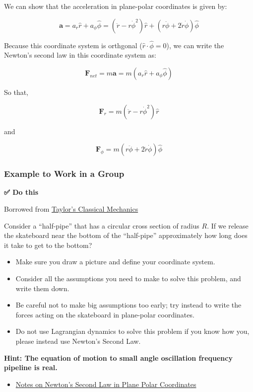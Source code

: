 We can show that the acceleration in plane-polar coordinates is given
by:

\[\mathbf{a} = a_r\hat{r} + a_{\phi}\hat{\phi} = \left(\ddot{r}-r\dot{\phi}^2\right)\hat{r} + \left(r\ddot{\phi}+2\dot{r}\dot{\phi}\right)\hat{\phi}\]

Because this coordinate system is orthgonal
(\(\hat{r}\cdot\hat{\phi} = 0\)), we can write the Newton's second law
in this coordinate system as:

\[\mathbf{F}_{net} = m\mathbf{a} = m\left(a_r\hat{r} + a_{\phi}\hat{\phi} \right)\]

So that,

\[\mathbf{F}_r = m\left(\ddot{r}-r\dot{\phi}^2\right)\hat{r}\]

and

\[\mathbf{F}_{\phi} = m\left(r\ddot{\phi}+2\dot{r}\dot{\phi}\right)\hat{\phi}\]

\subsubsection{Example to Work in a
Group}\label{example-to-work-in-a-group}

\textbf{✅ Do this}

Borrowed from
\href{https://bookshop.org/p/books/classical-mechanics-john-r-taylor/17213436?ean=9781891389221}{Taylor's
Classical Mechanics}

Consider a ``half-pipe'' that has a circular cross section of radius
\(R\). If we release the skateboard near the bottom of the ``half-pipe''
approximately how long does it take to get to the bottom?

\begin{itemize}
\tightlist
\item
  Make sure you draw a picture and define your coordinate system.
\item
  Consider all the assumptions you need to make to solve this problem,
  and write them down.
\item
  Be careful not to make big assumptions too early; try instead to write
  the forces acting on the skateboard in plane-polar coordinates.
\item
  Do not use Lagrangian dynamics to solve this problem if you know how
  you, please instead use Newton's Second Law.
\end{itemize}

\textbf{Hint: The equation of motion to small angle oscillation
frequency pipeline is real.}

\begin{itemize}
\tightlist
\item
  \href{../../assets/notes/Notes-Newton_2nd_Plane_polar.pdf}{Notes on
  Newton's Second Law in Plane Polar Coordinates}
\end{itemize}
